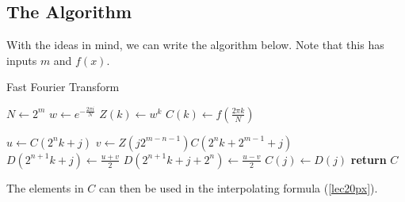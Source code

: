 \documentclass[letterpaper]{article}
\begin{document}
\subsection{The Algorithm}
With the ideas in mind, we can write the algorithm below. Note that this has inputs $m$ and $f(x)$. 
\begin{algorithm}[H]
    \caption{Fast Fourier Transform}
    \begin{algorithmic}[1]
            \State $N \gets 2^m$
            \State $w \gets e^{-\frac{2\pi i}{N}}$
                \State $Z(k) \gets w^k$
                \State $C(k) \gets f\left(\frac{2\pi k}{N}\right)$
            \EndFor 

                        \State $u \gets C(2^n k + j)$
                        \State $v \gets Z(j2^{m - n - 1}) C(2^n k + 2^{m - 1} + j)$
                        \State $D(2^{n + 1} k + j) \gets \frac{u + v}{2}$
                        \State $D(2^{n + 1} k + j + 2^{n}) \gets \frac{u - v}{2}$
                    \EndFor 
                \EndFor 
                    \State $C(j) \gets D(j)$
                \EndFor 
            \EndFor 
            \State \textbf{return} $C$
        \EndFunction
    \end{algorithmic}
\end{algorithm}
The elements in $C$ can then be used in the interpolating formula (\ref{lec20px}).
\end{document}
